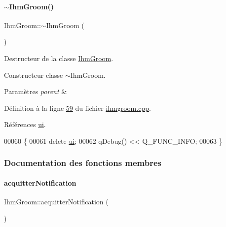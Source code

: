 \paragraph{\texorpdfstring{$\sim$\+Ihm\+Groom()}{~IhmGroom()}}
{\footnotesize\ttfamily Ihm\+Groom\+::$\sim$\+Ihm\+Groom (\begin{DoxyParamCaption}{ }\end{DoxyParamCaption})}



Destructeur de la classe \hyperlink{class_ihm_groom}{Ihm\+Groom}. 

Constructeur classe $\sim$\+Ihm\+Groom.


\begin{DoxyParams}{Paramètres}
{\em parent} & \\
\hline
\end{DoxyParams}


Définition à la ligne \hyperlink{ihmgroom_8cpp_source_l00059}{59} du fichier \hyperlink{ihmgroom_8cpp_source}{ihmgroom.\+cpp}.



Références \hyperlink{ihmgroom_8h_source_l00085}{ui}.


\begin{DoxyCode}
00060 \{
00061     \textcolor{keyword}{delete} \hyperlink{class_ihm_groom_af652e1ce199213b7867e44cf589c06b8}{ui};
00062      qDebug() << Q\_FUNC\_INFO;
00063 \}
\end{DoxyCode}


\subsubsection{Documentation des fonctions membres}
\mbox{\label{class_ihm_groom_a428ffaecbab91abb0824ad61afd3109e}} 
\paragraph{\texorpdfstring{acquitter\+Notification}{acquitterNotification}}
{\footnotesize\ttfamily Ihm\+Groom\+::acquitter\+Notification (\begin{DoxyParamCaption}{ }\end{DoxyParamCaption})\hspace{0.3cm}{\ttfamily [slot]}}



